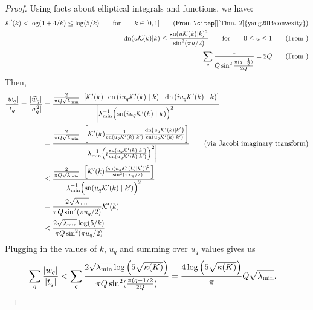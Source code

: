 \begin{proof}
  Using facts about elliptical integrals and functions, we have:
  \begin{align}
    \mathcal{K}'(k) < \log(1 + 4 / k) \leq \log( 5 / k) \qquad {\rm for} \qquad k \in [0, 1]
    \tag{From \citep[][Thm. 2]{yang2019convexity}}
    \\
    \text{dn}(u \mathcal{K}(k) | k ) \le \frac{\text{sn}(u \mathcal{K}(k) | k )^2}{\sin^2(\pi u/2)} \qquad {\rm for} \qquad 0 \le u \le 1
    \tag{From \gp{? maybe \citep{siegl2016extremal}}}
    \\
    \sum_q \frac{1}{ Q \sin^2 \frac{\pi(q-\tfrac{1}{2})}{2Q} }  = 2 Q
    \tag{From \gp{?}}
  \end{align}
  Then,
  \begin{align*}
    \frac{|w_q|}{|t_q|}
    =
    \frac{|\widetilde w_q|}{|\sigma^2_q|}
    &= \frac{
      \frac{ 2 }{ \pi Q \sqrt{\lambda_\text{min}} }
      \:\: \left[
      \mathcal{K}'( k )
      \:\:\: \text{cn} \left( i u_q \mathcal{K}'(k) \mid k \right)
      \:\:\: \text{dn} \left( i u_q \mathcal{K}'(k) \mid k \right)
      \right]
    }{
      \left| \lambda_\text{min}^{-1} \Bigl( \text{sn}(i u_q \mathcal{K}'(k) \mid k) \Bigr)^2 \right|
    }
    \\
    &= \frac{
      \frac{ 2 }{ \pi Q \sqrt{\lambda_\text{min}} }
      \:\: \left[
      \mathcal{K}'( k )
      \frac{
        1
      }{
        \text{cn} \left( u_q \mathcal{K}'(k) \mid k' \right)
      }
      \frac{
        \text{dn} \left( u_q \mathcal{K}'(k) \mid k' \right)
      }{
        \text{cn} \left( u_q \mathcal{K}'(k) \mid k' \right)
      }
      \right]
    }{
      \left| \lambda_\text{min}^{-1} \Bigl( i \frac{
        \text{sn}(u_q \mathcal{K}'(k) \mid k')
      }{
        \text{cn}(u_q \mathcal{K}'(k) \mid k')
      }\Bigr)^2 \right|
    }
    \tag{via Jacobi imaginary transform}
    \\
    &\leq \frac{
      \frac{ 2 }{ \pi Q \sqrt{\lambda_\text{min}} }
      \:\: \left[
        \mathcal{K}'( k ) \frac{
          ({
            \text{sn}(u_q \mathcal{K}'(k) \mid k')
          })^2
        }{
          \sin^2 ( \pi u_q / 2)
        }
      \right]
    }{
      \lambda_\text{min}^{-1} \Bigl({
        \text{sn}(u_q \mathcal{K}'(k) \mid k')
      }\Bigr)^2
    }
    \\
    &= \frac{ 2 \sqrt{\lambda_\text{min}} }{ \pi Q \sin^2 ( \pi u_q / 2) } \mathcal{K}'(k)
    \\
    &< \frac{ 2 \sqrt{\lambda_\text{min}} \log(5 / k) }{ \pi Q \sin^2 ( \pi u_q / 2) }
  \end{align*}
  Plugging in the values of $k$, $u_q$ and summing over $u_q$ values gives us
  \begin{align}
    \sum_{q} \frac{|w_q|}{|t_q|}
    &<
    \sum_{q} \frac{ 2 \sqrt{\lambda_\text{min}} \log \left( 5 \sqrt{\kappa(K)} \right)}
    { \pi Q \sin^2 ( \frac{\pi (q - 1/2}{2Q}) }
    = \frac{4 \log \left( 5 \sqrt{\kappa(K)} \right)}{\pi} Q \sqrt{\lambda_\text{min}}.
  \end{align}
\end{proof}







